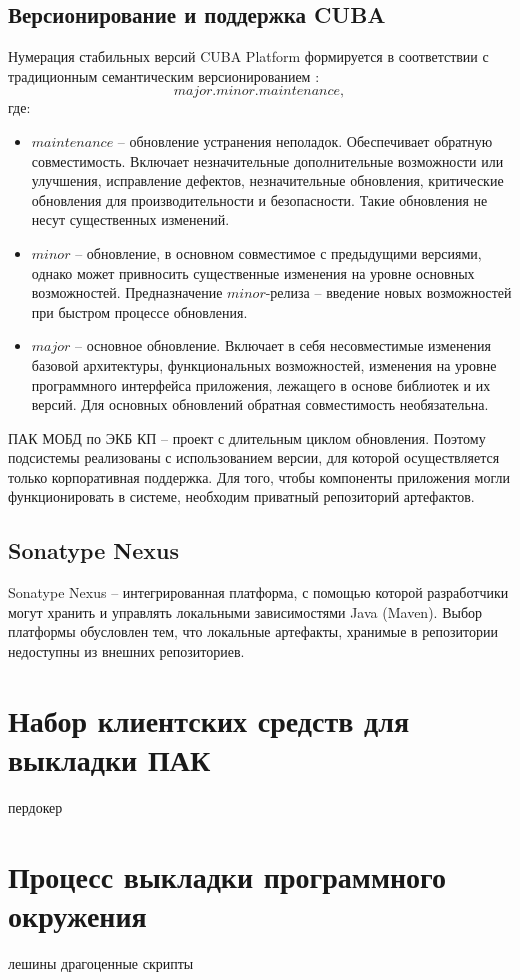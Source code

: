 \subsection{Версионирование и поддержка CUBA}

Нумерация стабильных версий CUBA Platform формируется в соответствии с традиционным семантическим версионированием \cite{cuba-ver}:
\begin{equation*}
	major.minor.maintenance,
\end{equation*}
где:
\begin{itemize}
	\item  $maintenance$ -- обновление устранения неполадок. Обеспечивает обратную совместимость. Включает незначительные дополнительные возможности или улучшения, исправление дефектов, незначительные обновления, критические обновления для производительности и безопасности. Такие обновления не несут существенных изменений.
	\item $minor$ --  обновление, в основном совместимое с предыдущими версиями, однако может привносить существенные изменения на уровне основных возможностей. Предназначение $minor$-релиза -- введение новых возможностей при быстром процессе обновления.
	\item $major$ -- основное обновление. Включает в себя несовместимые изменения базовой архитектуры, функциональных возможностей, изменения на уровне программного интерфейса приложения, лежащего в основе библиотек и их версий. Для основных обновлений обратная совместимость необязательна.
\end{itemize}
ПАК МОБД по ЭКБ КП -- проект с длительным циклом обновления. Поэтому подсистемы реализованы с использованием версии, для которой осуществляется только корпоративная поддержка. Для того, чтобы компоненты приложения могли функционировать в системе, необходим приватный репозиторий артефактов.

\subsection{Sonatype Nexus}
Sonatype Nexus -- интегрированная платформа, с помощью которой разработчики могут хранить и управлять локальными зависимостями Java (Maven). Выбор платформы обусловлен тем, что локальные артефакты, хранимые в репозитории недоступны из внешних репозиториев.

\section{Набор клиентских средств для выкладки ПАК}

пердокер

\section{Процесс выкладки программного окружения}

лешины драгоценные скрипты


